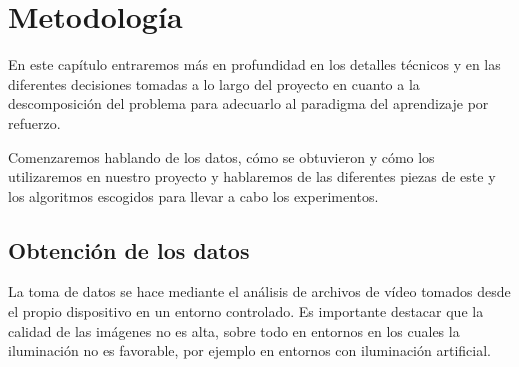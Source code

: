 
\cleardoublepage

\chapter{Metodología}
\label{metodologia}

En este capítulo entraremos más en profundidad en los detalles técnicos y en las diferentes decisiones tomadas a lo largo del proyecto en cuanto a la descomposición del problema para adecuarlo al paradigma del aprendizaje por refuerzo.
\medskip

Comenzaremos hablando de los datos, cómo se obtuvieron y cómo los utilizaremos en nuestro proyecto y hablaremos de las diferentes piezas de este y los algoritmos escogidos para llevar a cabo los experimentos.
\medskip

\section{Obtención de los datos}
\label{obtencion-datos}

La toma de datos se hace mediante el análisis de archivos de vídeo tomados desde el propio dispositivo en un entorno controlado. Es importante destacar que la calidad de las imágenes no es alta, sobre todo en entornos en los cuales la iluminación no es favorable, por ejemplo en entornos con iluminación artificial. 
\medskip

